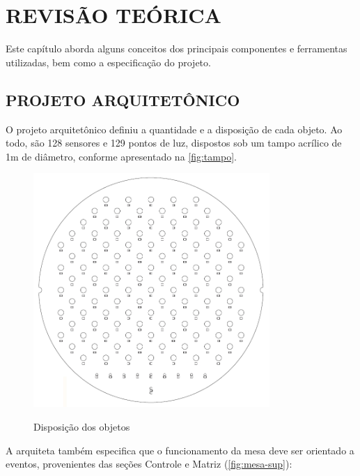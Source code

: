 
\chapter{REVISÃO TEÓRICA}
\label{chap:fundamentacaoTeorica}

Este capítulo aborda alguns conceitos dos principais componentes e ferramentas utilizadas, bem como a especificação do projeto.

\section{PROJETO ARQUITETÔNICO}
\label{sec:matrizLed}

O projeto arquitetônico definiu a quantidade e a disposição de cada objeto. Ao todo, são 128 sensores e 129 pontos de luz, dispostos sob um tampo acrílico de 1m de diâmetro, conforme apresentado na \autoref{fig:tampo}.

\begin{figure}[H]
    \centering
    \caption{Disposição dos objetos}
    \includegraphics[width=0.8\textwidth]{./dados/figuras/tampo}
    \label{fig:tampo}
\end{figure}

A arquiteta também especifica que o funcionamento da mesa deve ser orientado a eventos, provenientes das seções Controle e Matriz (\autoref{fig:mesa-sup}):

